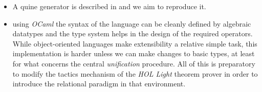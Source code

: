 \documentclass[a4paper,12pt]{article}
\begin{document}
\begin{itemize}
\item A quine generator is described in \citep{Byrd:2012:MLU:2661103.2661105}
and we aim to reproduce it.

\item using \emph{OCaml} the syntax of the language can be cleanly defined by
algebraic datatypes and the type system helps in the design of the required
operators.  While object-oriented languages make extensibility a relative
simple task, this implementation is harder unless we can make changes to basic
types, at least for what concerns the central \emph{unification} procedure.
All of this is preparatory to modify the tactics mechanism of the \emph{HOL
Light} theorem prover in order to introduce the relational paradigm in that
environment.
\end{itemize}



\end{document}
